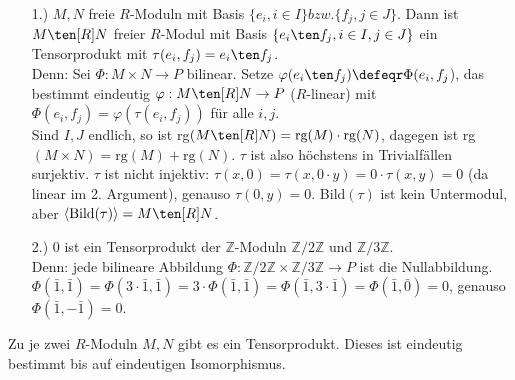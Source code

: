 \begin{nnBsp}
  \begin{enumerate}
    \item[1.)] $M, N$ freie $R$-Moduln mit Basis $\{e_i, i \in I\} bzw. \{f_j, j
               \in J\}$. Dann ist $M \ten[R] N$ freier $R$-Modul mit Basis
               $\{e_i\ten f_j, i \in I, j \in J\}$ ein Tensorprodukt mit
               $\tau(e_i,f_j) = e_i\ten f_j$.\\
               Denn: Sei $\Phi: M \times N \to P$ bilinear. Setze
               $\varphi(e_i \ten f_j) \defeqr \Phi(e_i,f_j$), das bestimmt eindeutig
               $\varphi: M \ten[R] N \to P$ ($R$-linear) mit $\Phi(e_i,f_j) =
               \varphi(\tau(e_i,f_j))$ für alle $i,j$.\\
               Sind $I, J$ endlich, so ist rg$(M \ten[R] N) = \mbox{rg}(M) \cdot
               \mbox{rg}(N)$, dagegen ist rg$(M \times N) = \mbox{rg}(M) +
               \mbox{rg}(N)$. $\tau$ ist also höchstens in Trivialfällen
               surjektiv. $\tau$ ist nicht injektiv: $\tau(x,0) = \tau(x,0 \cdot
               y) = 0 \cdot \tau(x,y) = 0$ (da linear im 2. Argument), genauso
               $\tau(0,y) = 0$. Bild$(\tau)$ ist kein Untermodul, aber $\langle
               \mbox{Bild}(\tau) \rangle = M \ten[R] N$.
    \item[2.)] $0$ ist ein Tensorprodukt der $\mathbb{Z}$-Moduln
               $\mathbb{Z}/2\mathbb{Z}$ und $\mathbb{Z}/3\mathbb{Z}$.\\
               Denn: jede bilineare Abbildung $\Phi: \mathbb{Z}/2\mathbb{Z}
               \times \mathbb{Z}/3\mathbb{Z} \to P$ ist die Nullabbildung.
               $\Phi(\bar{1},\bar{1}) = \Phi(3 \cdot \bar{1},\bar{1}) = 3 \cdot
               \Phi(\bar{1},\bar{1}) = \Phi(\bar{1},3 \cdot \bar{1}) =
               \Phi(\bar{1},\bar{0})= 0$, genauso $\Phi(\bar{1},-\bar{1}) = 0$.
  \end{enumerate}
\end{nnBsp}

\begin{Satz}
  Zu je zwei $R$-Moduln $M,N$ gibt es ein Tensorprodukt. Dieses ist eindeutig
  bestimmt bis auf eindeutigen Isomorphismus.
\end{Satz}

